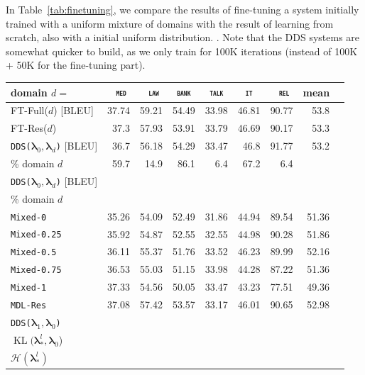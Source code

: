 \documentclass[11pt,a4paper]{article}
\newcommand{\fyTodo}[1]{\Todo[FY:]{\textcolor{orange}{#1}}}
\newcommand{\domain}[1]{\texttt{\textsc{#1}}}
\newcommand{\system}[1]{\texttt{{#1}}}
\newcommand{\vlambda}{\ensuremath{\boldsymbol\lambda}\xspace} %
\begin{document}
\fyTodo{Fix the table}
In Table~\ref{tab:finetuning}, we compare the results of fine-tuning a system initially trained with a uniform mixture\fyTodo{uniform or natural?} of domains with the result of learning from scratch, also with a initial uniform distribution. \fyTodo{What do we see ? How about domain proximity ? - show a graph}. Note that the DDS systems are somewhat quicker to build, as we only train for 100K iterations (instead of 100K + 50K for the fine-tuning part).

\begin{table}
  \centering \small
  \begin{tabular}{|l|*8{r|}} \hline
    domain \hfill $d=$ & \multicolumn{1}{c|}{\domain{ med}} & \multicolumn{1}{c|}{\domain{ law}} & \multicolumn{1}{c|}{\domain{bank}} & \multicolumn{1}{c|}{\domain{talk}} & \multicolumn{1}{c|}{\domain{ it }} & \multicolumn{1}{c|}{\domain{ rel}} & \multicolumn{1}{c|}{mean} \\ \hline
    FT-Full($d$) \hfill [BLEU] &37.74&59.21&54.49&33.98&46.81&90.77&53.8\\
    FT-Res($d$) \hfill &37.3&57.93&53.91&33.79&46.69&90.17&53.3\\ \hline
    \hline
    \system{DDS($\vlambda_0, \vlambda_d$)} \hfill [BLEU] &36.7&56.18&54.29&33.47&46.8&91.77&53.2\\
    \% domain $d$ &59.7&14.9&86.1&6.4&67.2&6.4\\ \hline
    \system{DDS($\vlambda_0, \vlambda_d$)} \hfill [BLEU]&  \\ 
    \% domain $d$& \\ \hline\hline
    \system{Mixed-0}      & 35.26 & 54.09 & 52.49 & 31.86 & 44.94 & 89.54& 51.36 \\
    \system{Mixed-0.25} & 35.92 & 54.87 & 52.55 & 32.55 & 44.98 & 90.28& 51.86 \\
    \system{Mixed-0.5}   & 36.11 & 55.37 & 51.76 & 33.52 & 46.23 & 89.99& 52.16 \\
    \system{Mixed-0.75} & 36.53 & 55.03 & 51.15 & 33.98 & 44.28 & 87.22& 51.36 \\
    \system{Mixed-1}     & 37.33  & 54.56 & 50.05 & 33.47 & 43.23 & 77.51& 49.36 \\
    \system{MDL-Res} &37.08&57.42&53.57&33.17&46.01&90.65&52.98\\\hline
    \system{DDS($\vlambda_1, \vlambda_0$)} & \\
    $\operatorname{KL}(\vlambda_*^{l}, \vlambda_0$) & \\
    $ \mathcal{H}(\vlambda_*^{l})$ &  \\

\end{tabular}
\end{table}
\end{document}

